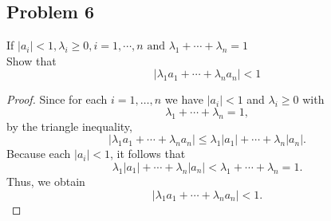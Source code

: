 \documentclass[letterpaper, 11pt]{article}
\newcommand{\1}{\mathds{1}}	%
\theoremstyle{definition}
\begin{document}
\subsection*{Problem 6}
If $ |a_i|<1,\lambda_i\geq0,i=1,\cdots,n\text{ and }\lambda_1+\cdots+\lambda_n=1 $\\
Show that$$
    |\lambda_1a_1+\cdots+\lambda_na_n|<1
$$  
\begin{proof}
    Since for each \( i=1,\dots,n \) we have \(|a_i| < 1\) and \(\lambda_i \ge 0\) with
\[
\lambda_1+\cdots+\lambda_n=1,
\]
by the triangle inequality,
\[
\left|\lambda_1a_1+\cdots+\lambda_na_n\right| \le \lambda_1|a_1|+\cdots+\lambda_n|a_n|.
\]
Because each \(|a_i|<1\), it follows that
\[
\lambda_1|a_1|+\cdots+\lambda_n|a_n| < \lambda_1+\cdots+\lambda_n = 1.
\]
Thus, we obtain
\[
\left|\lambda_1a_1+\cdots+\lambda_na_n\right| < 1.
\]
\end{proof}
\end{document}
